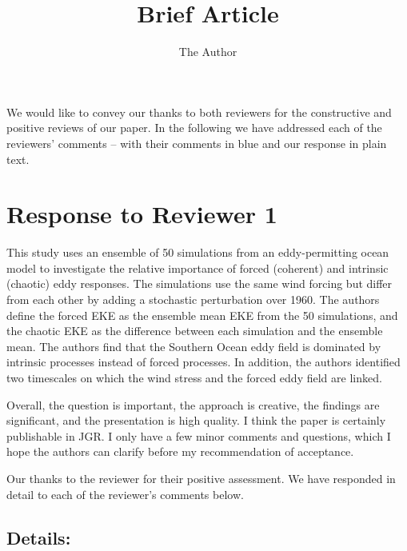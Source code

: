 \documentclass[11pt]{article}
\title{Brief Article}
\author{The Author}
\begin{document}

We would like to convey our thanks to both reviewers for the constructive and positive reviews of our paper. 
In the following we have addressed each of the reviewers' comments -- with their comments in blue and our response in plain text.

\section*{Response to Reviewer 1}

{\color{blue} This study uses an ensemble of 50 simulations from an eddy-permitting ocean model to investigate the relative importance of forced (coherent) and intrinsic (chaotic) eddy responses. The simulations use the same wind forcing but differ from each other by adding a stochastic perturbation over 1960. The authors define the forced EKE as the ensemble mean EKE from the 50 simulations, and the chaotic EKE as the difference between each simulation and the ensemble mean. The authors find that the Southern Ocean eddy field is dominated by intrinsic processes instead of forced processes. In addition, the authors identified two timescales on which the wind stress and the forced eddy field are linked. 

Overall, the question is important, the approach is creative, the findings are significant, and the presentation is high quality. I think the paper is certainly publishable in JGR. I only have a few minor comments and questions, which I hope the authors can clarify before my recommendation of acceptance.\\}

\noindent Our thanks to the reviewer for their positive assessment. 
We have responded in detail to each of the reviewer's comments below.

\subsection*{\color{blue}Details:}
\end{document}
